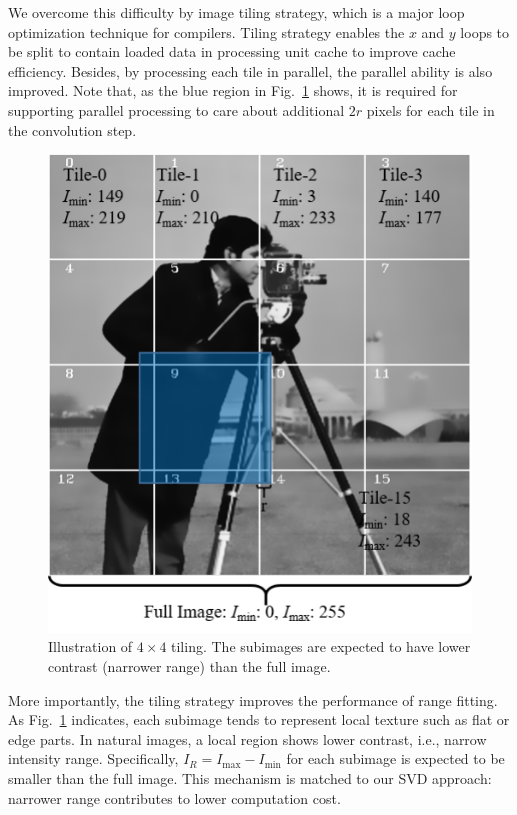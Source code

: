\documentclass{article}
\begin{document}
We overcome this difficulty by image tiling strategy, which is a major loop optimization technique for compilers.
Tiling strategy enables the $x$ and $y$ loops to be split to contain loaded data in processing unit cache to improve cache efficiency.
Besides, by processing each tile in parallel, the parallel ability is also improved.
Note that, as the blue region in Fig.~\ref{f:tile} shows, it is required for supporting parallel processing to care about additional $2r$ pixels for each tile in the convolution step.

\begin{figure}[t]
\centering
\includegraphics[width=0.6\columnwidth]{fig/tile.pdf}
\caption{Illustration of $4 \times 4$ tiling. The subimages are expected to have lower contrast (narrower range) than the full image.}
\label{f:tile}
\end{figure}

More importantly, the tiling strategy improves the performance of range fitting.
As Fig.~\ref{f:tile} indicates, each subimage tends to represent local texture such as flat or edge parts.
In natural images, a local region shows lower contrast, i.e., narrow intensity range.
Specifically, $I_{R}=I_{\max}-I_{\min}$ for each subimage is expected to be smaller than the full image.
This mechanism is matched to our SVD approach: narrower range contributes to lower computation cost.

\end{document}
